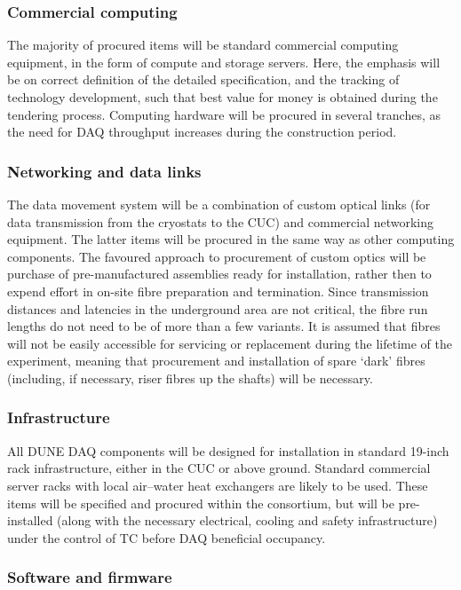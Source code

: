\subsubsection{Commercial computing}

The majority of procured items will be standard commercial computing equipment, in the form of compute and storage servers. Here, the emphasis will be on correct definition of the detailed specification, and the tracking of technology development, such that best value for money is obtained during the tendering process. Computing hardware will be procured in several tranches, as the need for DAQ throughput increases during the construction period. 

\subsubsection{Networking and data links}

The data movement system will be a combination of custom optical links (for data transmission from the cryostats to the CUC) and commercial networking equipment. The latter items will be procured in the same way as other computing components. The favoured approach to procurement of custom optics will be purchase of pre-manufactured assemblies ready for installation, rather then to expend effort in on-site fibre preparation and termination. Since transmission distances and latencies in the underground area are not critical, the fibre run lengths do not need to be of more than a few variants. It is assumed that fibres will not be easily accessible for servicing or replacement during the lifetime of the experiment, meaning that procurement and installation of spare `dark' fibres (including, if necessary, riser fibres up the shafts) will be necessary.

\subsubsection{Infrastructure}

All DUNE DAQ components will be designed for installation in standard 19-inch rack infrastructure, either in the CUC or above ground. Standard commercial server racks with local air--water heat exchangers are likely to be used. These items will be specified and procured within the consortium, but will be pre-installed (along with the necessary electrical, cooling and safety infrastructure) under the control of TC before DAQ beneficial occupancy.

\subsubsection{Software and firmware}

